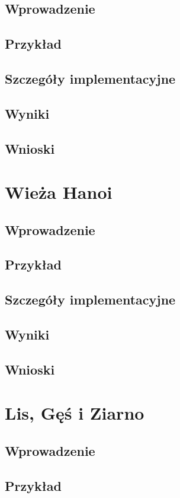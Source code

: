     \subsection{Wprowadzenie}
    \subsection{Przykład}
    \subsection{Szczegóły implementacyjne}
    \subsection{Wyniki}
    \subsection{Wnioski}
\section{Wieża Hanoi}
    \subsection{Wprowadzenie}
    \subsection{Przykład}
    \subsection{Szczegóły implementacyjne}
    \subsection{Wyniki}
    \subsection{Wnioski}
\section{Lis, Gęś i Ziarno}
    \subsection{Wprowadzenie}
    \subsection{Przykład}
